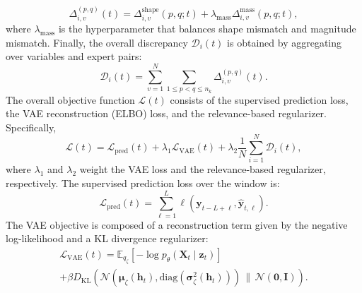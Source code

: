 ﻿\documentclass[journal]{IEEEtran}
\begin{document}
\begin{equation}
\Delta_{i,v}^{(p,q)}(t)=\Delta_{i,v}^{\mathrm{shape}}(p,q;t)+\lambda_{\mathrm{mass}}\Delta_{i,v}^{\mathrm{mass}}(p,q;t),
\end{equation}
where $\lambda_{\mathrm{mass}}$ is the hyperparameter that balances shape mismatch and magnitude mismatch. Finally, the overall discrepancy $\mathcal{D}_{i}(t)$ is obtained by aggregating over variables and expert pairs:
\begin{equation}
\mathcal{D}_{i}(t)=\sum_{v=1}^{N}\sum_{1\le p<q\le n_k}\Delta_{i,v}^{(p,q)}(t).
\end{equation}
The overall objective function $\mathcal{L}(t)$ consists of the supervised prediction loss, the VAE reconstruction (ELBO) loss, and the relevance-based regularizer. Specifically,
\begin{equation}
\mathcal{L}(t)=\mathcal{L}_{\mathrm{pred}}(t)+\lambda_{1}\mathcal{L}_{\mathrm{VAE}}(t)+\lambda_{2}\frac{1}{N}\sum_{i=1}^{N}\mathcal{D}_{i}(t),
\end{equation}
where $\lambda_{1}$ and $\lambda_{2}$ weight the VAE loss and the relevance-based regularizer, respectively. The supervised prediction loss over the window is:
\begin{equation}
\mathcal{L}_{\mathrm{pred}}(t)=\sum_{\ell=1}^{L}\ell\!\left(\mathbf{y}_{t-L+\ell},\widehat{\mathbf{y}}_{t,\ell}\right).
\end{equation}
The VAE objective is composed of a reconstruction term given by the negative log-likelihood and a KL divergence regularizer:
\begin{equation}
\begin{gathered}
\mathcal{L}_{\mathrm{VAE}}(t)=\mathbb{E}_{q_{\zeta}}\!\left[-\log p_{\theta}(\mathbf{X}_t\mid\mathbf{z}_t)\right]\\
+\beta D_{\mathrm{KL}}\!\left(\mathcal{N}(\boldsymbol{\mu}_{\zeta}(\mathbf{h}_t),\mathrm{diag}(\boldsymbol{\sigma}^2_{\zeta}(\mathbf{h}_t)))\,\|\,\mathcal{N}(\mathbf{0},\mathbf{I})\right).
\end{gathered}
\end{equation}

\end{document}
